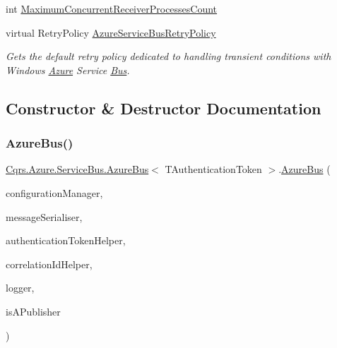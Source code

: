 \begin{DoxyCompactItemize}
\item 
int \hyperlink{classCqrs_1_1Azure_1_1ServiceBus_1_1AzureBus_a6b517888d91c6a5b026cb5857e75a04f}{Maximum\+Concurrent\+Receiver\+Processes\+Count}
\item 
virtual Retry\+Policy \hyperlink{classCqrs_1_1Azure_1_1ServiceBus_1_1AzureBus_a88997183f8e6fa9dcef5b883329e95ce}{Azure\+Service\+Bus\+Retry\+Policy}
\begin{DoxyCompactList}\small\item\em Gets the default retry policy dedicated to handling transient conditions with Windows \hyperlink{namespaceCqrs_1_1Azure}{Azure} Service \hyperlink{namespaceCqrs_1_1Bus}{Bus}. \end{DoxyCompactList}\end{DoxyCompactItemize}


\subsection{Constructor \& Destructor Documentation}
\mbox{\label{classCqrs_1_1Azure_1_1ServiceBus_1_1AzureBus_a1046ff74282fd178f43e28420433d2a9}} 
\subsubsection{\texorpdfstring{Azure\+Bus()}{AzureBus()}}
{\footnotesize\ttfamily \hyperlink{classCqrs_1_1Azure_1_1ServiceBus_1_1AzureBus}{Cqrs.\+Azure.\+Service\+Bus.\+Azure\+Bus}$<$ T\+Authentication\+Token $>$.\hyperlink{classCqrs_1_1Azure_1_1ServiceBus_1_1AzureBus}{Azure\+Bus} (\begin{DoxyParamCaption}\item[{\hyperlink{interfaceCqrs_1_1Configuration_1_1IConfigurationManager}{I\+Configuration\+Manager}}]{configuration\+Manager,  }\item[{\hyperlink{interfaceCqrs_1_1Azure_1_1ServiceBus_1_1IMessageSerialiser}{I\+Message\+Serialiser}$<$ T\+Authentication\+Token $>$}]{message\+Serialiser,  }\item[{\hyperlink{interfaceCqrs_1_1Authentication_1_1IAuthenticationTokenHelper}{I\+Authentication\+Token\+Helper}$<$ T\+Authentication\+Token $>$}]{authentication\+Token\+Helper,  }\item[{I\+Correlation\+Id\+Helper}]{correlation\+Id\+Helper,  }\item[{I\+Logger}]{logger,  }\item[{bool}]{is\+A\+Publisher }\end{DoxyParamCaption})\hspace{0.3cm}{\ttfamily [protected]}}



